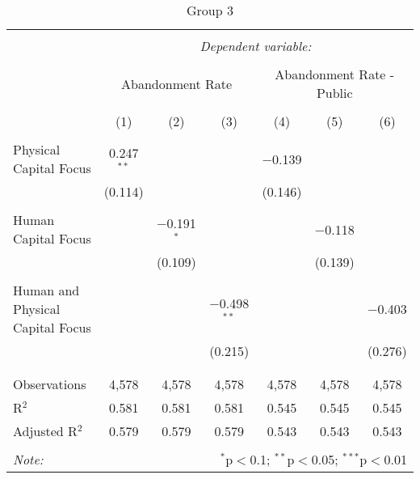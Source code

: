 
\begin{table}[!htbp] \centering 
  \caption{Group 3} 
  \label{} 
\begin{tabular}{@{\extracolsep{5pt}}lcccccc} 
\\[-1.8ex]\hline 
\hline \\[-1.8ex] 
 & \multicolumn{6}{c}{\textit{Dependent variable:}} \\ 
\cline{2-7} 
\\[-1.8ex] & \multicolumn{3}{c}{Abandonment Rate} & \multicolumn{3}{c}{Abandonment Rate - Public} \\ 
\\[-1.8ex] & (1) & (2) & (3) & (4) & (5) & (6)\\ 
\hline \\[-1.8ex] 
 Physical Capital Focus & 0.247$^{**}$ &  &  & $-$0.139 &  &  \\ 
  & (0.114) &  &  & (0.146) &  &  \\ 
  & & & & & & \\ 
 Human Capital Focus &  & $-$0.191$^{*}$ &  &  & $-$0.118 &  \\ 
  &  & (0.109) &  &  & (0.139) &  \\ 
  & & & & & & \\ 
 Human and Physical Capital Focus &  &  & $-$0.498$^{**}$ &  &  & $-$0.403 \\ 
  &  &  & (0.215) &  &  & (0.276) \\ 
  & & & & & & \\ 
\hline \\[-1.8ex] 
Observations & 4,578 & 4,578 & 4,578 & 4,578 & 4,578 & 4,578 \\ 
R$^{2}$ & 0.581 & 0.581 & 0.581 & 0.545 & 0.545 & 0.545 \\ 
Adjusted R$^{2}$ & 0.579 & 0.579 & 0.579 & 0.543 & 0.543 & 0.543 \\ 
\hline 
\hline \\[-1.8ex] 
\textit{Note:}  & \multicolumn{6}{r}{$^{*}$p$<$0.1; $^{**}$p$<$0.05; $^{***}$p$<$0.01} \\ 
\end{tabular} 
\end{table} 
